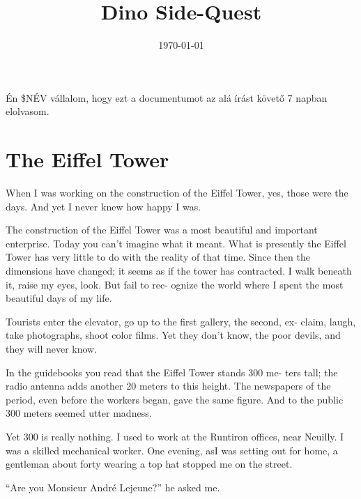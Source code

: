 \documentclass[12pt]{article}
\title{Dino Side-Quest}
\date{\today}
\begin{document}
\begin{titlepage}
    \fontsize{22pt}{22pt}\selectfont
    \maketitle
    Én \${NÉV} vállalom,
    hogy ezt a documentumot az alá írást követő 7 napban elolvasom.

    \vspace{1cm}
    \dotfill

    \vspace{1cm}
    \dotfill

    \vspace{1cm}
    \dotfill

    \vfill
\end{titlepage}

\section*{The Eiffel Tower}
\fontsize{25pt}{22pt}\selectfont

\bigskip

When I was working on the construction of the Eiffel Tower, yes,
those were the days. And yet I never knew how happy I was.

The construction of the Eiffel Tower was a most beautiful and
important enterprise. Today you can’t imagine what it meant. What
is presently the Eiffel Tower has very little to do with the reality of that
time. Since then the dimensions have changed; it seems as if the tower
has contracted. I walk beneath it, raise my eyes, look. But
fail to rec-
ognize the world where I spent the most beautiful days of my life.

Tourists enter the elevator, go up to the first gallery, the second, ex-
claim, laugh, take photographs, shoot color films. Yet they don’t
know, the poor devils, and they will never know.

In the guidebooks you read that the Eiffel Tower stands 300 me-
ters tall; the radio antenna adds another 20 meters to this height. The
newspapers of the period, even before the workers began, gave the
same figure. And to the public 300 meters seemed utter madness.

Yet 300 is really nothing. I used to work at the Runtiron offices,
near Neuilly. I was a skilled mechanical worker. One evening, asI was
setting out for home, a gentleman about forty wearing a top hat
stopped me on the street.

“Are you Monsieur André Lejeune?” he asked me.
\end{document}
